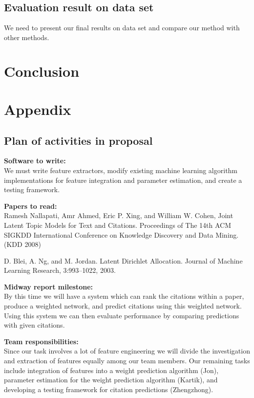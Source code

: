 \documentclass{article} %
\begin{document}
\subsection{Evaluation result on data set}
We need to present our final results on data set and compare our method with other methods.
\section{Conclusion}



\nocite{*}

\newpage
\section{Appendix}
\subsection{Plan of activities in proposal}
\textbf{Software to write:}\\
We must write feature extractors, modify existing machine learning algorithm implementations
for feature integration and parameter estimation, and create a testing framework.

\textbf{Papers to read:}\\
Ramesh Nallapati, Amr Ahmed, Eric P. Xing, and William W. Cohen, Joint Latent Topic Models
for Text and Citations. Proceedings of The 14th ACM SIGKDD International Conference on
Knowledge Discovery and Data Mining. (KDD 2008)

D. Blei, A. Ng, and M. Jordan. Latent Dirichlet Allocation. Journal of Machine Learning
Research, 3:993–1022, 2003.

\textbf{Midway report milestone:}\\
By this time we will have a system which can rank the citations within a paper, produce a
weighted network, and predict citations using this weighted network. Using this system we can
then evaluate performance by comparing predictions with given citations.

\textbf{Team responsibilities:}\\
Since our task involves a lot of feature engineering we will divide the investigation and
extraction of features equally among our team members. Our remaining tasks include integration
of features into a weight prediction algorithm (Jon), parameter estimation for the weight
prediction algorithm (Kartik), and developing a testing framework for citation predictions
(Zhengzhong).
\end{document}
